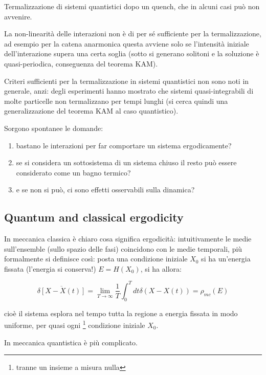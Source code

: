 \documentclass[a4paper,10pt,twocolumn]{article}
\begin{document}
Termalizzazione di sistemi quantistici dopo un quench, che in alcuni casi può non avvenire.

La non-linearità delle interazioni non è di per sé sufficiente per la termalizzazione, ad esempio per la catena anarmonica questa avviene solo se l'intensità iniziale dell'interazione supera una certa soglia (sotto si generano solitoni e la soluzione è quasi-periodica, conseguenza del teorema KAM).

Criteri sufficienti per la termalizzazione in sistemi quantistici non sono noti in generale, anzi: degli esperimenti hanno mostrato che sistemi quasi-integrabili di molte particelle non termalizzano per tempi lunghi (si cerca quindi una generalizzazione del teorema KAM al caso quantistico).
\newline

\noindent Sorgono spontanee le domande:
\begin{enumerate}
	\item bastano le interazioni per far comportare un sistema ergodicamente?
	\item se si considera un sottosistema di un sistema chiuso il resto può essere considerato come un bagno termico?
	\item e se non si può, ci sono effetti osservabili sulla dinamica?
\end{enumerate}

\subsection{Quantum and classical ergodicity}
In meccanica classica è chiaro cosa significa ergodicità: intuitivamente le medie sull'ensemble (sullo spazio delle fasi) coincidono con le medie temporali, più formalmente si definisce così: posta una condizione iniziale $X_0$ si ha un'energia fissata (l'energia si conserva!) $E = H(X_0)$, si ha allora:

\begin{equation}
	\overline{\delta[X - X(t)]} = \lim\limits_{T \rightarrow \infty} \frac{1}{T} \int_{0}^{T} dt \delta(X-X(t)) = \rho_{mc} (E)
\end{equation}

\noindent cioè il sistema esplora nel tempo tutta la regione a energia fissata in modo uniforme, per quasi ogni \footnote{tranne un insieme a misura nulla} condizione iniziale $X_0$.
\newline

In meccanica quantistica è più complicato.
\end{document}
